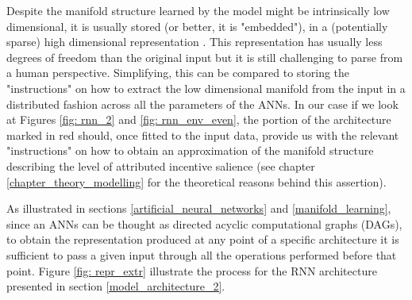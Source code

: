 Despite the manifold structure learned by the model might be intrinsically low dimensional, it is usually stored (or better, it is "embedded"), in a (potentially sparse) high dimensional representation \cite{bengio2017deep}. This representation has usually less degrees of freedom than the original input but it is still challenging to parse from a human perspective. Simplifying, this can be compared to storing the "instructions" on how to extract the low dimensional manifold from the input in a distributed fashion across all the parameters of the ANNs. In our case if we look at Figures \ref{fig: rnn_2} and \ref{fig: rnn_env_even}, the portion of the architecture marked in red should, once fitted to the input data, provide us with the relevant "instructions" on how to obtain an approximation of the manifold structure describing the level of attributed incentive salience (see chapter \ref{chapter_theory_modelling} for the theoretical reasons behind this assertion).

As illustrated in sections \ref{artificial_neural_networks} and \ref{manifold_learning}, since an ANNs can be thought as directed acyclic computational graphs (DAGs), to obtain the representation produced at any point of a specific architecture it is sufficient to pass a given input through all the operations performed before that point. Figure \ref{fig: repr_extr} illustrate the process for the RNN architecture presented in section \ref{model_architecture_2}.


